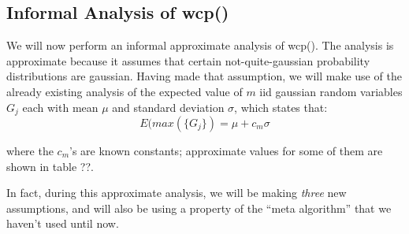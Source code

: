 \documentclass{sig-alternate}
\begin{document}
% 


\subsection{Informal Analysis of wcp()}

We will now perform an informal approximate analysis of wcp(). The analysis is 
approximate because it assumes that certain not-quite-gaussian probability distributions
are gaussian. Having made that assumption, we will make use of the already 
existing analysis of the expected value of $m$ iid gaussian random variables $G_j$ each with
mean $\mu$ and standard deviation $\sigma$, which states that:
\begin{equation}
E(max(\{G_j\}) = \mu + c_m \sigma
\end{equation}

\noindent where the $c_m$'s are known constants; approximate values for some
of them are shown in table ??.

In fact, during this approximate analysis, we will be making {\em three} new assumptions, and will also
be using a property of the ``meta algorithm'' that we haven't used until now.
\end{document}
